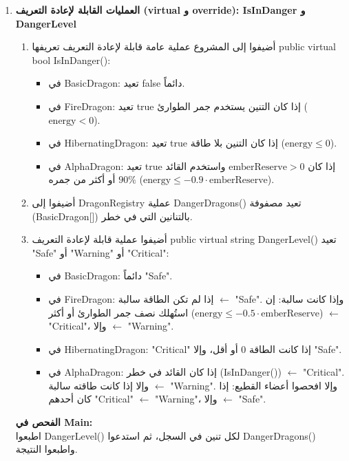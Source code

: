 \documentclass[14pt]{extarticle}
\begin{document}
\begin{enumerate}[resume, label=\textbf{تمرين \arabic*:}, wide=0pt, leftmargin=*, itemsep=2.2em]
    \item \textbf{العمليات القابلة لإعادة التعريف (\textenglish{virtual} و \textenglish{override}): \textenglish{IsInDanger} و \textenglish{DangerLevel}}
    \begin{enumerate}[label=\textbf{(\arabic*)}]
        \item أضيفوا إلى المشروع عملية عامة قابلة لإعادة التعريف تعريفها \textenglish{public virtual bool IsInDanger()}:
        \begin{itemize}
            \item في \textenglish{BasicDragon}: تعيد \textenglish{false} دائماً.
            \item في \textenglish{FireDragon}: تعيد \textenglish{true} إذا كان التنين يستخدم جمر الطوارئ ($\text{energy} < 0$).
            \item في \textenglish{HibernatingDragon}: تعيد \textenglish{true} إذا كان التنين بلا طاقة ($\text{energy} \le 0$).
            \item في \textenglish{AlphaDragon}: تعيد \textenglish{true} إذا كان $\text{emberReserve} > 0$ واستخدم القائد $90\%$ أو أكثر من جمره ($\text{energy} \le -0.9 \cdot \text{emberReserve}$).
        \end{itemize}
        \item أضيفوا إلى \textenglish{DragonRegistry} عملية \textenglish{DangerDragons()} تعيد مصفوفة (\textenglish{BasicDragon[]}) بالتنانين التي في خطر.
        \item أضيفوا عملية قابلة لإعادة التعريف \textenglish{public virtual string DangerLevel()} تعيد \textenglish{"Safe"} أو \textenglish{"Warning"} أو \textenglish{"Critical"}:
        \begin{itemize}
            \item في \textenglish{BasicDragon}: دائماً \textenglish{"Safe"}.
            \item في \textenglish{FireDragon}: إذا لم تكن الطاقة سالبة $\leftarrow$ \textenglish{"Safe"}. وإذا كانت سالبة: إن استُهلك نصف جمر الطوارئ أو أكثر ($\text{energy} \le -0.5 \cdot \text{emberReserve}$) $\leftarrow$ \textenglish{"Critical"}، وإلا $\leftarrow$ \textenglish{"Warning"}.
            \item في \textenglish{HibernatingDragon}: \textenglish{"Critical"} إذا كانت الطاقة $0$ أو أقل، وإلا \textenglish{"Safe"}.
            \item في \textenglish{AlphaDragon}: إذا كان القائد في خطر (\textenglish{IsInDanger()}) $\leftarrow$ \textenglish{"Critical"}. وإلا إذا كانت طاقته سالبة $\leftarrow$ \textenglish{"Warning"}. وإلا افحصوا أعضاء القطيع: إذا كان أحدهم \textenglish{"Critical"} $\leftarrow$ \textenglish{"Warning"}، وإلا $\leftarrow$ \textenglish{"Safe"}.
        \end{itemize}
    \end{enumerate}
    \textbf{الفحص في \textenglish{Main}:} \\
    اطبعوا \textenglish{DangerLevel()} لكل تنين في السجل، ثم استدعوا \textenglish{DangerDragons()} واطبعوا النتيجة.


\end{enumerate}
\end{document}

